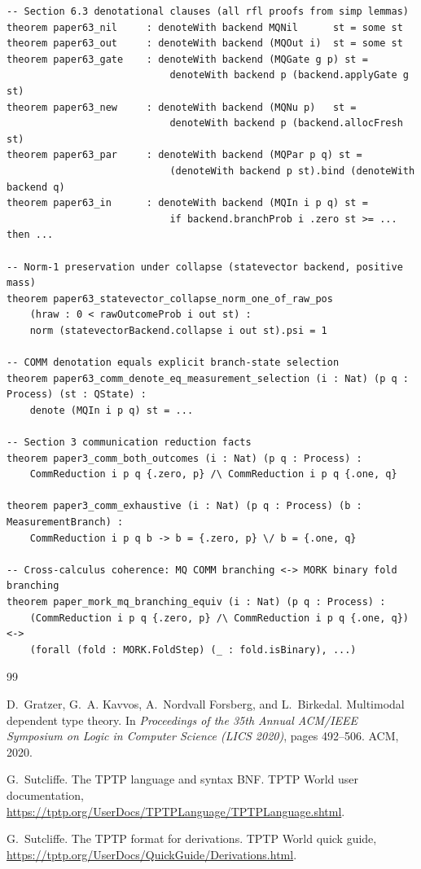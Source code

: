\documentclass[11pt]{article}
\begin{document}
\begin{lstlisting}[language={},caption={Stable paper-to-theorem index (\texttt{PaperMap.lean})}]
-- Section 6.3 denotational clauses (all rfl proofs from simp lemmas)
theorem paper63_nil     : denoteWith backend MQNil      st = some st
theorem paper63_out     : denoteWith backend (MQOut i)  st = some st
theorem paper63_gate    : denoteWith backend (MQGate g p) st =
                            denoteWith backend p (backend.applyGate g st)
theorem paper63_new     : denoteWith backend (MQNu p)   st =
                            denoteWith backend p (backend.allocFresh st)
theorem paper63_par     : denoteWith backend (MQPar p q) st =
                            (denoteWith backend p st).bind (denoteWith backend q)
theorem paper63_in      : denoteWith backend (MQIn i p q) st =
                            if backend.branchProb i .zero st >= ... then ...

-- Norm-1 preservation under collapse (statevector backend, positive mass)
theorem paper63_statevector_collapse_norm_one_of_raw_pos
    (hraw : 0 < rawOutcomeProb i out st) :
    norm (statevectorBackend.collapse i out st).psi = 1

-- COMM denotation equals explicit branch-state selection
theorem paper63_comm_denote_eq_measurement_selection (i : Nat) (p q : Process) (st : QState) :
    denote (MQIn i p q) st = ...

-- Section 3 communication reduction facts
theorem paper3_comm_both_outcomes (i : Nat) (p q : Process) :
    CommReduction i p q {.zero, p} /\ CommReduction i p q {.one, q}

theorem paper3_comm_exhaustive (i : Nat) (p q : Process) (b : MeasurementBranch) :
    CommReduction i p q b -> b = {.zero, p} \/ b = {.one, q}

-- Cross-calculus coherence: MQ COMM branching <-> MORK binary fold branching
theorem paper_mork_mq_branching_equiv (i : Nat) (p q : Process) :
    (CommReduction i p q {.zero, p} /\ CommReduction i p q {.one, q}) <->
    (forall (fold : MORK.FoldStep) (_ : fold.isBinary), ...)
\end{lstlisting}

\begin{thebibliography}{99}

D.~Gratzer, G.~A. Kavvos, A.~Nordvall Forsberg, and L.~Birkedal.
\newblock Multimodal dependent type theory.
\newblock In \emph{Proceedings of the 35th Annual ACM/IEEE Symposium on
  Logic in Computer Science (LICS 2020)}, pages 492--506. ACM, 2020.

G.~Sutcliffe.
\newblock The TPTP language and syntax BNF.
\newblock TPTP World user documentation,
  \url{https://tptp.org/UserDocs/TPTPLanguage/TPTPLanguage.shtml}.

G.~Sutcliffe.
\newblock The TPTP format for derivations.
\newblock TPTP World quick guide,
  \url{https://tptp.org/UserDocs/QuickGuide/Derivations.html}.

\end{thebibliography}
\end{document}
